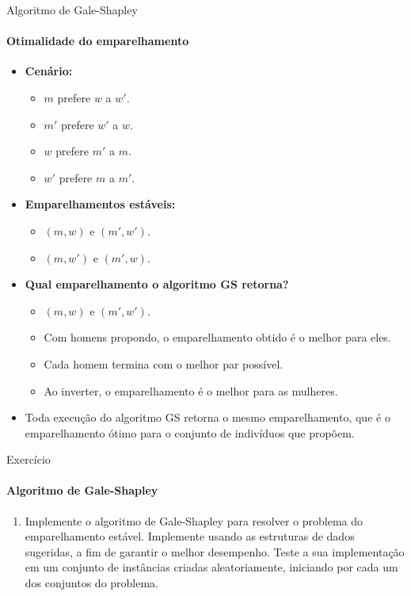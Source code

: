 \begin{frame}{Algoritmo de Gale-Shapley}
\framesubtitle{Otimalidade do emparelhamento}

\begin{itemize}
	\item \textbf{Cenário:}
	\begin{itemize}
		\item $m$ prefere $w$ a $w'$.
		\item $m'$ prefere $w'$ a $w$.
		\item $w$ prefere $m'$ a $m$.
		\item $w'$ prefere $m$ a $m'$.
	\end{itemize}
	
	\pause
	\item \textbf{Emparelhamentos estáveis:}
	\begin{itemize}
		\item $(m, w)$ e $(m', w')$.
		\item $(m, w')$ e $(m', w)$.
	\end{itemize}

	\pause
	\item \textbf{Qual emparelhamento o algoritmo GS retorna?}
	\begin{itemize}
		\item $(m, w)$ e $(m', w')$.
		\item Com homens propondo, o emparelhamento obtido é o melhor para eles.
		\item Cada homem termina com o melhor par possível.
		\item Ao inverter, o emparelhamento é o melhor para as mulheres.
	\end{itemize}

	\pause
	\item {\color{magenta}Toda execução do algoritmo GS retorna o mesmo emparelhamento, que é o emparelhamento ótimo para o conjunto de indivíduos que propõem.}
\end{itemize}
\end{frame}




\begin{frame}{Exercício}
\framesubtitle{Algoritmo de Gale-Shapley}
	\begin{enumerate}
		\item Implemente o algoritmo de Gale-Shapley para resolver o problema do emparelhamento estável. Implemente usando as estruturas de dados sugeridas, a fim de garantir o melhor desempenho. Teste a sua implementação em um conjunto de instâncias criadas aleatoriamente, iniciando por cada um dos conjuntos do problema.
	\end{enumerate}
\end{frame}

%	


